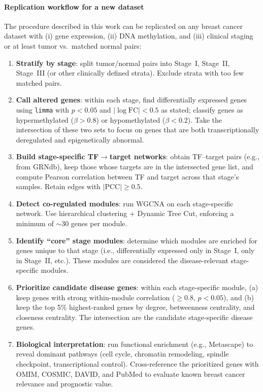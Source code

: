 \documentclass[10pt]{extarticle}
\begin{document}
\paragraph{Replication workflow for a new dataset}
The procedure described in this work can be replicated on any breast cancer dataset with (i) gene expression, (ii) DNA methylation, and (iii) clinical staging or at least tumor vs.\ matched normal pairs:
\begin{enumerate}
    \item \textbf{Stratify by stage}: split tumor/normal pairs into Stage~I, Stage~II, Stage~III (or other clinically defined strata). Exclude strata with too few matched pairs.
    \item \textbf{Call altered genes}: within each stage, find differentially expressed genes using \texttt{limma} with $p<0.05$ and $|\log \text{FC}|<0.5$ as stated; classify genes as hypermethylated ($\beta>0.8$) or hypomethylated ($\beta<0.2$). Take the intersection of these two sets to focus on genes that are both transcriptionally deregulated and epigenetically abnormal.
    \item \textbf{Build stage-specific TF$\to$target networks}: obtain TF--target pairs (e.g., from GRNdb), keep those whose targets are in the intersected gene list, and compute Pearson correlation between TF and target across that stage's samples. Retain edges with $|\text{PCC}|\ge 0.5$.
    \item \textbf{Detect co-regulated modules}: run WGCNA on each stage-specific network. Use hierarchical clustering + Dynamic Tree Cut, enforcing a minimum of $\sim$30 genes per module.
    \item \textbf{Identify ``core'' stage modules}: determine which modules are enriched for genes unique to that stage (i.e., differentially expressed only in Stage~I, only in Stage~II, etc.). These modules are considered the disease-relevant stage-specific modules.
    \item \textbf{Prioritize candidate disease genes}: within each stage-specific module, (a) keep genes with strong within-module correlation ($\ge 0.8$, $p<0.05$), and (b) keep the top 5\% highest-ranked genes by degree, betweenness centrality, and closeness centrality. The intersection are the candidate stage-specific disease genes.
    \item \textbf{Biological interpretation}: run functional enrichment (e.g., Metascape) to reveal dominant pathways (cell cycle, chromatin remodeling, spindle checkpoint, transcriptional control). Cross-reference the prioritized genes with OMIM, COSMIC, DAVID, and PubMed to evaluate known breast cancer relevance and prognostic value.
\end{enumerate}
\end{document}

